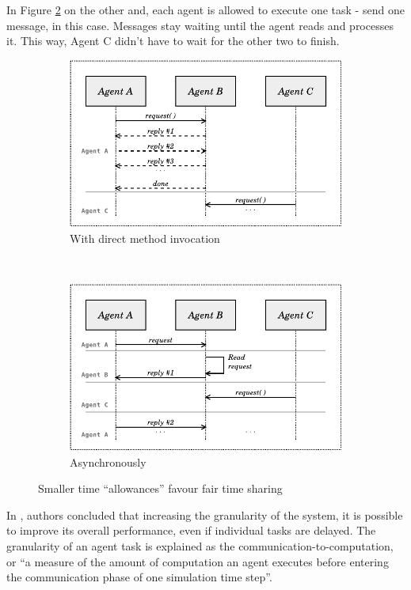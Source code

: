 In Figure \ref{fig:assynch_execution} on the other and, each agent is allowed to execute one task - send one message, in this case. Messages stay waiting until the agent reads and processes it. This way, Agent C didn't have to wait  for the other two to finish.

\begin{figure}[ht]
	\centering
    \begin{subfigure}[b]{\linewidth}
		\centering
		\includegraphics[width=.7\linewidth]{figures/executionProblem.pdf}
		\caption{
			With direct method invocation
		}
		\label{fig:direct_method_execution}
    \end{subfigure} \\
    \begin{subfigure}[b]{\linewidth}
		\centering
		\includegraphics[width=.7\linewidth]{figures/executionProblem2.pdf}
		\caption{
			Asynchronously 
		}
		\label{fig:assynch_execution}
    \end{subfigure}
    \caption[Time sharing example]{Smaller time ``allowances'' favour fair time sharing}
    \label{fig:execution_problems}
\end{figure}

In \cite{mengistu2008scalability}, authors concluded that increasing the granularity of the system, it is possible to improve its overall performance, even if individual tasks are delayed. The granularity of an agent task is explained as the communication-to-computation, or ``a measure of the amount of computation an agent executes before entering the communication phase of one simulation time step''.

